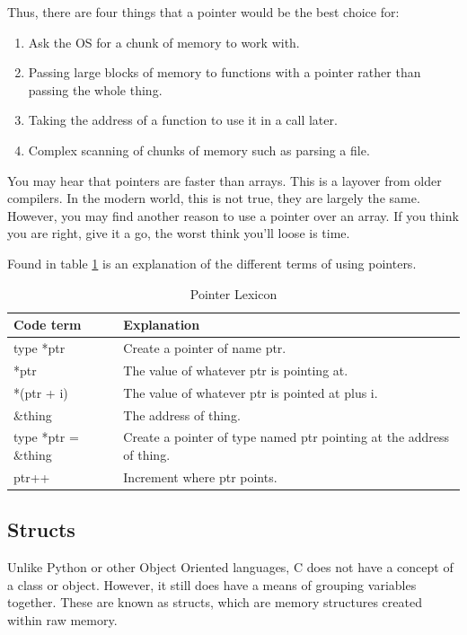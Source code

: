 \documentclass[a4paper,11pt]{report}
\begin{document}
			Thus, there are four things that a pointer would be the best choice for:
			\begin{enumerate}
				\item Ask the OS for a chunk of memory to work with. 
				\item Passing large blocks of memory to functions with a pointer rather than passing the whole thing. 
				\item Taking the address of a function to use it in a call later. 
				\item Complex scanning of chunks of memory such as parsing a file. 
			\end{enumerate}
			You may hear that pointers are faster than arrays. 
			This is a layover from older compilers. 
			In the modern world, this is not true, they are largely the same. 
			However, you may find another reason to use a pointer over an array. 
			If you think you are right, give it a go, the worst think you'll loose is time. 

			Found in table \ref{tab:PointerLexicon} is an explanation of the different terms of using pointers. 
			
			\begin{table}[htb]
				\centering
				\begin{tabular}{| l | p{8cm} |}
					\hline
					\textbf{Code term} & \textbf{Explanation} \\ \hline 
					type *ptr & Create a pointer of name ptr. \\ \hline
					*ptr & The value of whatever ptr is pointing at. \\ \hline
					*(ptr + i) & The value of whatever ptr is pointed at plus i. \\ \hline
					\&thing & The address of thing. \\ \hline
					type *ptr = \&thing & Create a pointer of type named ptr pointing at the address of thing. \\ \hline
					ptr++ & Increment where ptr points. \\ \hline
				\end{tabular}
				\caption{Pointer Lexicon}
				\label{tab:PointerLexicon}
			\end{table}
		\subsection{Structs}
			Unlike Python or other Object Oriented languages, C does not have a concept of a class or object. 
			However, it still does have a means of grouping variables together. 
			These are known as structs, which are memory structures created within raw memory.
\end{document}

